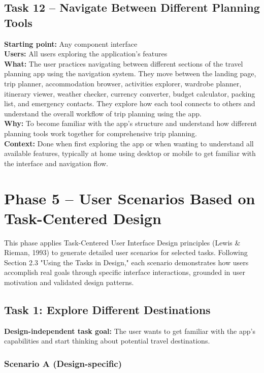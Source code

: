 \documentclass[11pt,a4paper]{article}
\begin{document}
\subsection*{Task 12 – Navigate Between Different Planning Tools}
\textbf{Starting point:} Any component interface \\
\textbf{Users:} All users exploring the application's features \\
\textbf{What:} The user practices navigating between different sections of the travel planning app using the navigation system. They move between the landing page, trip planner, accommodation browser, activities explorer, wardrobe planner, itinerary viewer, weather checker, currency converter, budget calculator, packing list, and emergency contacts. They explore how each tool connects to others and understand the overall workflow of trip planning using the app. \\
\textbf{Why:} To become familiar with the app's structure and understand how different planning tools work together for comprehensive trip planning. \\
\textbf{Context:} Done when first exploring the app or when wanting to understand all available features, typically at home using desktop or mobile to get familiar with the interface and navigation flow.

\newpage
{}
\section*{Phase 5 – User Scenarios Based on Task-Centered Design}

This phase applies Task-Centered User Interface Design principles (Lewis \& Rieman, 1993) to generate detailed user scenarios for selected tasks. Following Section 2.3 "Using the Tasks in Design," each scenario demonstrates how users accomplish real goals through specific interface interactions, grounded in user motivation and validated design patterns.

\subsection*{Task 1: Explore Different Destinations}

\textbf{Design-independent task goal:}
The user wants to get familiar with the app's capabilities and start thinking about potential travel destinations.

\subsubsection*{Scenario A (Design-specific)}
\end{document}
